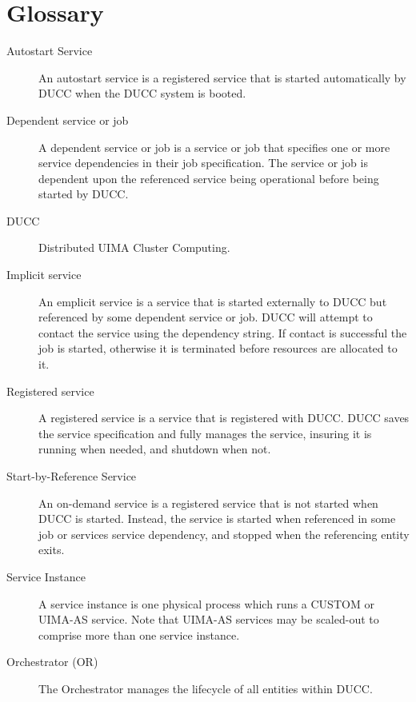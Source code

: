 \ifpdf
\else
{}
\fi
\chapter{Glossary}

\begin{description}
\item[Autostart Service] An autostart service is a registered service that is started automatically
  by DUCC when the DUCC system is booted.

\item[Dependent service or job] A dependent service or job is a service or job that specifies one
  or more service dependencies in their job specification. The service or job is dependent upon the
  referenced service being operational before being started by DUCC.

\item[DUCC] Distributed UIMA Cluster Computing.

\item[Implicit service] An emplicit service is a service that is started externally to DUCC but
  referenced by some dependent service or job.  DUCC will attempt to contact the service using
  the dependency string.  If contact is successful the job is started, otherwise it is 
  terminated before resources are allocated to it.

\item[Registered service] A registered service is a service that is registered with DUCC. DUCC
  saves the service specification and fully manages the service, insuring it is running when needed,
  and shutdown when not.

\item[Start-by-Reference Service] An on-demand service is a registered service that is not started when DUCC
  is started. Instead, the service is started when referenced in some job or services service
  dependency, and stopped when the referencing entity exits.

\item[Service Instance] A service instance is one physical process which runs a CUSTOM or UIMA-AS
  service.  Note that UIMA-AS services may be scaled-out to comprise more than one service instance.

\item[Orchestrator (OR)] The Orchestrator manages the lifecycle of all entities within DUCC.


\end{description}
